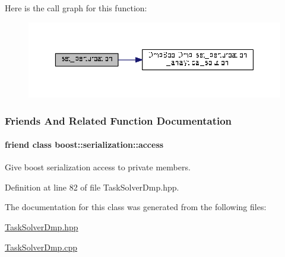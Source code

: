 Here is the call graph for this function\+:
\nopagebreak
\begin{figure}[H]
\begin{center}
\leavevmode
\includegraphics[width=350pt]{classDmpBbo_1_1TaskSolverDmp_a8abd9d1a1f4d871e203818298b37dc3c_cgraph}
\end{center}
\end{figure}




\subsubsection{Friends And Related Function Documentation}
\hypertarget{classDmpBbo_1_1TaskSolverDmp_ac98d07dd8f7b70e16ccb9a01abf56b9c}{
\paragraph[{boost\+::serialization\+::access}]{\setlength{\rightskip}{0pt plus 5cm}friend class boost\+::serialization\+::access\hspace{0.3cm}{\ttfamily [friend]}}}\label{classDmpBbo_1_1TaskSolverDmp_ac98d07dd8f7b70e16ccb9a01abf56b9c}


Give boost serialization access to private members. 



Definition at line 82 of file Task\+Solver\+Dmp.\+hpp.



The documentation for this class was generated from the following files\+:\begin{DoxyCompactItemize}
\item 
\hyperlink{TaskSolverDmp_8hpp}{Task\+Solver\+Dmp.\+hpp}\item 
\hyperlink{TaskSolverDmp_8cpp}{Task\+Solver\+Dmp.\+cpp}\end{DoxyCompactItemize}
